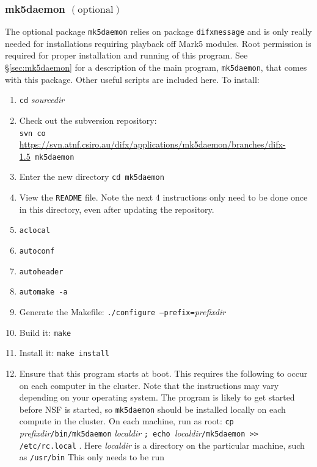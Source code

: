 
\subsubsection{mk5daemon {\small $\mathrm{(optional)}$}} 

The optional package {\tt mk5daemon} relies on package {\tt difxmessage} and is only really needed for installations requiring playback off Mark5 modules.
Root permission is required for proper installation and running of this program.
See \S\ref{sec:mk5daemon} for a description of the main program, {\tt mk5daemon}, that comes with this package.
Other useful scripts are included here.
To install:
\begin{enumerate}
\item {\tt cd} {\em sourcedir}
\item Check out the subversion repository: \\
{\tt svn co }\url{https://svn.atnf.csiro.au/difx/applications/mk5daemon/branches/difx-1.5}{\tt\ mk5daemon}
\item Enter the new directory {\tt cd mk5daemon}
\item View the {\tt README} file.  
Note the next 4 instructions only need to be done once in this directory, even after updating the repository.
\item {\tt aclocal}
\item {\tt autoconf}
\item {\tt autoheader}
\item {\tt automake -a}
\item Generate the Makefile: {\tt ./configure --prefix=}{\em prefixdir}
\item Build it: {\tt make}
\item Install it: {\tt make install}
\item Ensure that this program starts at boot.
This requires the following to occur on each computer in the cluster.
Note that the instructions may vary depending on your operating system.
The program is likely to get started before NSF is started, so {\tt mk5daemon} should be installed locally on each compute in the cluster.
On each machine, run as root: {\tt cp }{\em prefixdir}{\tt /bin/mk5daemon} {\em localdir} {\tt ; echo }{\em localdir}{\tt /mk5daemon >> /etc/rc.local} .
Here {\em localdir} is a directory on the particular machine, such as {\tt /usr/bin}
This only needs to be run
\end{enumerate}

